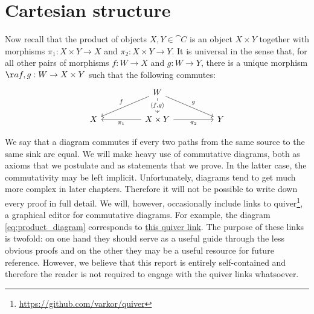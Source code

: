 \section{Cartesian structure}\label{sec:cartesian_categories}

Now recall that the product of objects $X,Y\in\cat{C}$ is an object $X\times Y$
together with morphisms $\pi_1 : X\times Y \to X$ and $\pi_2 : X\times Y \to
Y$. It is universal in the sense that, for all other pairs of morphisms $f:W\to
X$ and $g:W\to Y$, there is a unique morphism $\aa{f,g}:W\to X\times Y$ such
that the following commutes:
\begin{equation}\label{eq:product_diagram}
  \begin{tikzcd}
  && W \\
    X && {X\times Y} && Y
    \arrow["{\pi_2}"', from=2-3, to=2-5]
    \arrow["{\pi_1}", from=2-3, to=2-1]
    \arrow["{\langle f,g\rangle}"{description}, from=1-3, to=2-3]
    \arrow["f"', from=1-3, to=2-1]
    \arrow["g", from=1-3, to=2-5]
  \end{tikzcd}
\end{equation}

We say that a diagram commutes if every two paths from the same source to the
same sink are equal. We will make heavy use of commutative diagrams, both as
axioms that we postulate and as statements that we prove. In the latter case,
the commutativity may be left implicit. Unfortunately, diagrams tend to get
much more complex in later chapters. Therefore it will not be possible to write
down every proof in full detail. We will, however, occasionally include links
to quiver\footnote{\url{https://github.com/varkor/quiver}}, a graphical editor for commutative diagrams. For
example, the diagram \ref{eq:product_diagram} corresponds to \href{
  https://q.uiver.app/?q=WzAsNCxbMiwwLCJXIl0sWzIsMSwiWFxcdGltZXMgWSJdLFswLDEsIlgiXSxbNCwxLCJZIl0sWzEsMywiXFxwaV8yIiwyXSxbMSwyLCJcXHBpXzEiXSxbMCwxLCJcXGxhbmdsZSBmLGdcXHJhbmdsZSIsMV0sWzAsMiwiZiIsMl0sWzAsMywiZyJdXQ==
}{this quiver link}. The purpose of these links is twofold: on one hand they
should serve as a useful guide through the less obvious proofs and on the other
they may be a useful resource for future reference. However,
we believe that this report is entirely self-contained and therefore the reader
is not required to engage with the quiver links whatsoever.

